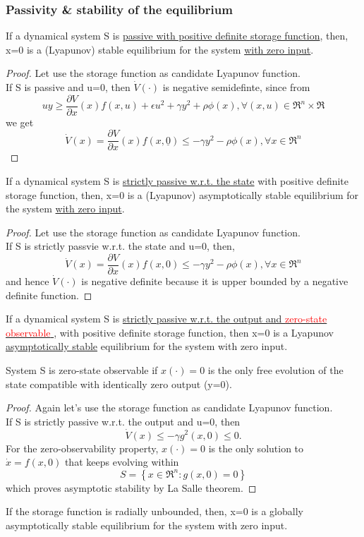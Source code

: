 \subsubsection{Passivity \& stability of the equilibrium}
\begin{thm}
	If a dynamical system S is \underline{passive with positive definite storage function}, then, x=0 is a (Lyapunov) stable equilibrium for the system \underline{with zero input}.
\end{thm}
\begin{proof}
	Let use the storage function as candidate Lyapunov function. \\If S is passive and u=0, then $\dot{V}(\cdot)$ is negative semidefinte, since from \[
	uy\ge\frac{\partial V}{\partial x}(x)f(x,u)+\epsilon u^2+\gamma y^2+\rho\phi(x),\forall(x,u)\in \Re^n\times\Re
	\] we get \[\dot{V}(x)=\frac{\partial V}{\partial x}(x)f(x,\underline{0})\le-\gamma y^2-\rho \phi(x),\forall x \in \Re^n\]
\end{proof}
\begin{thm}
	If a dynamical system S is \underline{strictly passive w.r.t. the state} with positive definite storage function, then, x=0 is a (Lyapunov) asymptotically stable equilibrium for the system \underline{with zero input}.
\end{thm}
\begin{proof}
	Let use the storage function as candidate Lyapunov function.\\
	If S is strictly passvie w.r.t. the state and u=0, then, 	\[\dot{V}(x)=\frac{\partial V}{\partial x}(x)f(x,0)\le -\gamma y^2-\rho\phi(x), \forall x \in \Re^n\] and hence $\dot{V}(\cdot)$ is negative definite because it is upper bounded by a negative definite function.
\end{proof}
\begin{thm}
	If a dynamical system S is \underline{strictly passive w.r.t. the output and \textcolor{red}{zero-state observable} }, with positive definite storage function, then x=0 is a Lyapunov \underline{asymptotically stable} equilibrium for the system with zero input.
\end{thm}
\begin{defn}
	System S is zero-state observable if $x(\cdot)=0$ is the only free evolution of the state compatible with identically zero output (y=0).
\end{defn}
\begin{proof}
	Again let's use the storage function as candidate Lyapunov function.\\ If S is strictly passive w.r.t. the output and u=0, then \[\dot{V}(x)\le-\gamma g^2(x,0)\le 0.\]For the zero-observability property, $x(\cdot)=0$ is the only solution to $\dot{x}=f(x,0)$ that keeps evolving within \[S=\left\{x\in \Re^n\colon g(x,0)=0\right\}\] which proves asymptotic stability by La Salle theorem.
\end{proof}
\begin{note}
	If the storage function is radially unbounded, then, x=0 is a globally asymptotically stable equilibrium for the system with zero input.
\end{note}
